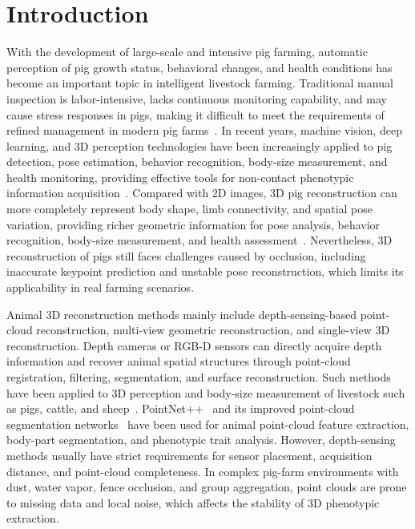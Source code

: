 \documentclass[runningheads]{llncs}
\begin{document}
\section{Introduction}
\label{sec:introduction}

With the development of large-scale and intensive pig farming, automatic perception of pig growth status, behavioral changes, and health conditions has become an important topic in intelligent livestock farming. Traditional manual inspection is labor-intensive, lacks continuous monitoring capability, and may cause stress responses in pigs, making it difficult to meet the requirements of refined management in modern pig farms~\cite{ref1,ref2,ref3}. In recent years, machine vision, deep learning, and 3D perception technologies have been increasingly applied to pig detection, pose estimation, behavior recognition, body-size measurement, and health monitoring, providing effective tools for non-contact phenotypic information acquisition~\cite{ref4,ref5,ref6,ref7,ref8}. Compared with 2D images, 3D pig reconstruction can more completely represent body shape, limb connectivity, and spatial pose variation, providing richer geometric information for pose analysis, behavior recognition, body-size measurement, and health assessment~\cite{ref8,ref9,ref10}. Nevertheless, 3D reconstruction of pigs still faces challenges caused by occlusion, including inaccurate keypoint prediction and unstable pose reconstruction, which limits its applicability in real farming scenarios.

Animal 3D reconstruction methods mainly include depth-sensing-based point-cloud reconstruction, multi-view geometric reconstruction, and single-view 3D reconstruction. Depth cameras or RGB-D sensors can directly acquire depth information and recover animal spatial structures through point-cloud registration, filtering, segmentation, and surface reconstruction. Such methods have been applied to 3D perception and body-size measurement of livestock such as pigs, cattle, and sheep~\cite{ref11}. PointNet++~\cite{ref12} and its improved point-cloud segmentation networks~\cite{ref13,ref14} have been used for animal point-cloud feature extraction, body-part segmentation, and phenotypic trait analysis. However, depth-sensing methods usually have strict requirements for sensor placement, acquisition distance, and point-cloud completeness. In complex pig-farm environments with dust, water vapor, fence occlusion, and group aggregation, point clouds are prone to missing data and local noise, which affects the stability of 3D phenotypic extraction.
\end{document}

